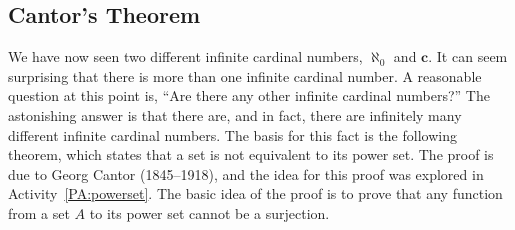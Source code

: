 \subsection*{Cantor's Theorem}

We have now seen two different infinite cardinal numbers, $\aleph_0$ and $\boldsymbol{c}$.  It can seem surprising that there is more than one infinite cardinal number.  A reasonable question at this point is, ``Are there any other infinite cardinal numbers?''  The astonishing answer is that there are, and in fact, there are infinitely many different infinite cardinal numbers.  The basis for this fact is the following theorem, which states that a set is not equivalent to its power set.  The proof is  due to Georg Cantor (1845--1918),
%
and the idea for this proof was explored in \typeu Activity~\ref*{PA:powerset}. The basic idea of the proof is to prove that any function from a set $A$ to its power set cannot be a surjection.

